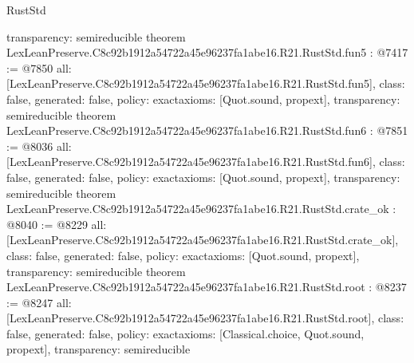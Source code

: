 \begin{lexlean}{RustStd}
\begin{coremodule}
{  transparency: semireducible
}
theorem LexLeanPreserve.C8c92b1912a54722a45e96237fa1abe16.R21.RustStd.fun5 : @7417 := @7850 {
  all: [LexLeanPreserve.C8c92b1912a54722a45e96237fa1abe16.R21.RustStd.fun5],
  class: false,
  generated: false,
  policy: exact{axioms: [Quot.sound, propext]},
  transparency: semireducible
}
theorem LexLeanPreserve.C8c92b1912a54722a45e96237fa1abe16.R21.RustStd.fun6 : @7851 := @8036 {
  all: [LexLeanPreserve.C8c92b1912a54722a45e96237fa1abe16.R21.RustStd.fun6],
  class: false,
  generated: false,
  policy: exact{axioms: [Quot.sound, propext]},
  transparency: semireducible
}
theorem LexLeanPreserve.C8c92b1912a54722a45e96237fa1abe16.R21.RustStd.crate_ok : @8040 := @8229 {
  all: [LexLeanPreserve.C8c92b1912a54722a45e96237fa1abe16.R21.RustStd.crate_ok],
  class: false,
  generated: false,
  policy: exact{axioms: [Quot.sound, propext]},
  transparency: semireducible
}
theorem LexLeanPreserve.C8c92b1912a54722a45e96237fa1abe16.R21.RustStd.root : @8237 := @8247 {
  all: [LexLeanPreserve.C8c92b1912a54722a45e96237fa1abe16.R21.RustStd.root],
  class: false,
  generated: false,
  policy: exact{axioms: [Classical.choice, Quot.sound, propext]},
  transparency: semireducible
}


\end{coremodule}
\end{lexlean}
